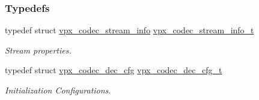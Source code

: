 \subsubsection*{\-Typedefs}
\begin{DoxyCompactItemize}
\item 
typedef struct \*
\hyperlink{structvpx__codec__stream__info}{vpx\-\_\-codec\-\_\-stream\-\_\-info} \hyperlink{group__decoder_ga900420e8f7cb9c1b3070b2ba7d636974}{vpx\-\_\-codec\-\_\-stream\-\_\-info\-\_\-t}
\begin{DoxyCompactList}\small\item\em \-Stream properties. \end{DoxyCompactList}\item 
typedef struct \hyperlink{structvpx__codec__dec__cfg}{vpx\-\_\-codec\-\_\-dec\-\_\-cfg} \hyperlink{group__decoder_ga4a2e808eb43f1e798024b5a409c484f9}{vpx\-\_\-codec\-\_\-dec\-\_\-cfg\-\_\-t}
\begin{DoxyCompactList}\small\item\em \-Initialization \-Configurations. \end{DoxyCompactList}\end{DoxyCompactItemize}
